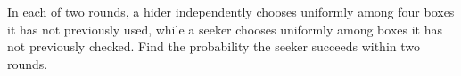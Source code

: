 In each of two rounds, a hider independently chooses uniformly among four boxes it has not previously used, while a seeker chooses uniformly among boxes it has not previously checked. Find the probability the seeker succeeds within two rounds.
